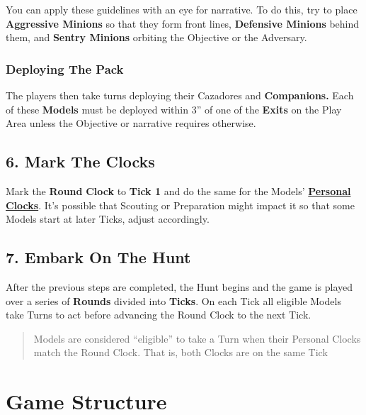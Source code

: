 \documentclass[
]{book}
\begin{document}
You can apply these guidelines with an eye for narrative. To do this, try to place \textbf{Aggressive Minions} so that they form front lines, \textbf{Defensive Minions} behind them, and \textbf{Sentry Minions} orbiting the Objective or the Adversary.

\hypertarget{deploying-the-pack}{%
\subsubsection*{Deploying The Pack}\label{deploying-the-pack}}

The players then take turns deploying their Cazadores and \textbf{Companions.} Each of these \textbf{Models} must be deployed within 3'' of one of the \textbf{Exits} on the Play Area unless the Objective or narrative requires otherwise.

\hypertarget{mark-the-clocks}{%
\subsection*{6. Mark The Clocks}\label{mark-the-clocks}}

Mark the \textbf{Round} \textbf{Clock} to \textbf{Tick 1} and do the same for the Models' \textbf{\protect\hyperlink{ticks}{Personal Clocks}}. It's possible that Scouting or Preparation might impact it so that some Models start at later Ticks, adjust accordingly.

\hypertarget{embark-on-the-hunt}{%
\subsection*{7. Embark On The Hunt}\label{embark-on-the-hunt}}

After the previous steps are completed, the Hunt begins and the game is played over a series of \textbf{Rounds} divided into \textbf{Ticks}. On each Tick all eligible Models take Turns to act before advancing the Round Clock to the next Tick.

\begin{quote}
Models are considered ``eligible'' to take a Turn when their Personal Clocks match the Round Clock. That is, both Clocks are on the same Tick
\end{quote}

\hypertarget{structure}{%
\section{Game Structure}\label{structure}}
\end{document}
